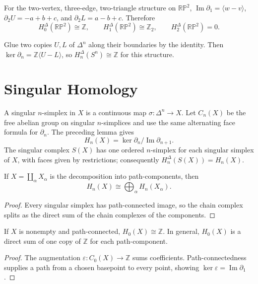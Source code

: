\begin{example}
\label{ex:simplicial-homology-rp2}
For the two-vertex, three-edge, two-triangle structure on $\mathbb{RP}^2$, $\operatorname{Im}\partial_1=\langle w-v\rangle$, $\partial_2U=-a+b+c$, and $\partial_2L=a-b+c$.  Therefore
\[
H_0^\Delta(\mathbb{RP}^2)\cong\mathbb{Z},\qquad H_1^\Delta(\mathbb{RP}^2)\cong\mathbb{Z}_2,\qquad H_2^\Delta(\mathbb{RP}^2)=0.
\]
\end{example}

\begin{example}
\label{ex:delta-complex-sn}
Glue two copies $U,L$ of $\Delta^n$ along their boundaries by the identity.  Then $\ker\partial_n=\mathbb{Z}\langle U-L\rangle$, so $H_n^\Delta(S^n)\cong\mathbb{Z}$ for this structure.
\end{example}

\section*{Singular Homology}

A singular $n$-simplex in $X$ is a continuous map $\sigma:\Delta^n\to X$.  Let $C_n(X)$ be the free abelian group on singular $n$-simplices and use the same alternating face formula for $\partial_n$.  The preceding lemma gives
\[
H_n(X)=\ker\partial_n/\operatorname{Im}\partial_{n+1}.
\]
The singular complex $S(X)$ has one ordered $n$-simplex for each singular simplex of $X$, with faces given by restrictions; consequently $H_n^\Delta(S(X))=H_n(X)$.

\begin{proposition}
\label{prop:homology-disjoint-union}
If $X=\coprod_\alpha X_\alpha$ is the decomposition into path-components, then
\[
H_n(X)\cong\bigoplus_\alpha H_n(X_\alpha).
\]
\end{proposition}
\begin{proof}
\sketch Every singular simplex has path-connected image, so the chain complex splits as the direct sum of the chain complexes of the components.
\end{proof}

\begin{proposition}
\label{prop:h0-path-connected}
If $X$ is nonempty and path-connected, $H_0(X)\cong\mathbb{Z}$.  In general, $H_0(X)$ is a direct sum of one copy of $\mathbb{Z}$ for each path-component.
\end{proposition}
\begin{proof}
\sketch The augmentation $\varepsilon:C_0(X)\to\mathbb{Z}$ sums coefficients.  Path-connectedness supplies a path from a chosen basepoint to every point, showing $\ker\varepsilon=\operatorname{Im}\partial_1$.
\end{proof}

